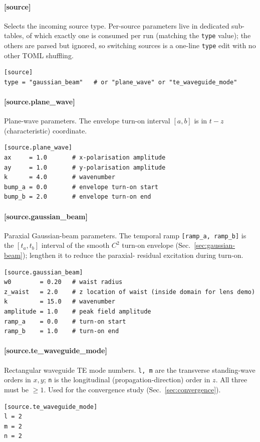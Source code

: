 \documentclass[11pt]{article}
\begin{document}
\paragraph{[source]} Selects the incoming source type. Per-source
parameters live in dedicated sub-tables, of which exactly one is
consumed per run (matching the \texttt{type} value); the others are
parsed but ignored, so switching sources is a one-line \texttt{type}
edit with no other TOML shuffling.
\begin{lstlisting}[language={}]
[source]
type = "gaussian_beam"   # or "plane_wave" or "te_waveguide_mode"
\end{lstlisting}

\paragraph{[source.plane\_wave]} Plane-wave parameters. The envelope
turn-on interval $[a, b]$ is in $t - z$ (characteristic) coordinate.
\begin{lstlisting}[language={}]
[source.plane_wave]
ax     = 1.0       # x-polarisation amplitude
ay     = 1.0       # y-polarisation amplitude
k      = 4.0       # wavenumber
bump_a = 0.0       # envelope turn-on start
bump_b = 2.0       # envelope turn-on end
\end{lstlisting}

\paragraph{[source.gaussian\_beam]} Paraxial Gaussian-beam parameters.
The temporal ramp \texttt{[ramp\_a, ramp\_b]} is the $[t_a, t_b]$
interval of the smooth $C^2$ turn-on envelope
(Sec.~\ref{sec:gaussian-beam}); lengthen it to reduce the paraxial-
residual excitation during turn-on.
\begin{lstlisting}[language={}]
[source.gaussian_beam]
w0        = 0.20   # waist radius
z_waist   = 2.0    # z location of waist (inside domain for lens demo)
k         = 15.0   # wavenumber
amplitude = 1.0    # peak field amplitude
ramp_a    = 0.0    # turn-on start
ramp_b    = 1.0    # turn-on end
\end{lstlisting}

\paragraph{[source.te\_waveguide\_mode]} Rectangular waveguide TE
mode numbers. \texttt{l, m} are the transverse standing-wave orders
in $x, y$; \texttt{n} is the longitudinal (propagation-direction)
order in $z$. All three must be $\geq 1$. Used for the convergence
study (Sec.~\ref{sec:convergence}).
\begin{lstlisting}[language={}]
[source.te_waveguide_mode]
l = 2
m = 2
n = 2
\end{lstlisting}
\end{document}
